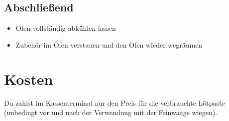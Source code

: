\documentclass{\basedir/fablab-document}
\begin{document}
\subsection{Abschließend}
\begin{itemize}
	\item Ofen vollständig abkühlen lassen
	\item Zubehör im Ofen verstauen und den Ofen wieder wegräumen
\end{itemize}





\section{Kosten}
Du zahlst im Kassenterminal nur den Preis für die verbrauchte Lötpaste (unbedingt vor und nach der Verwendung mit der Feinwaage wiegen).


\end{document}
